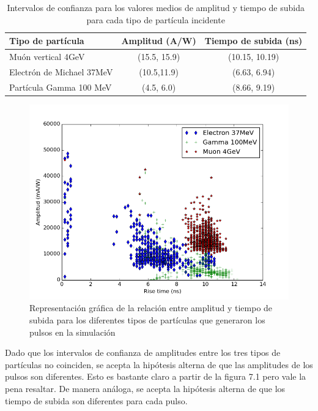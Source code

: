 \documentclass{book}
\begin{document}
\begin{table}[h]
\caption{ Intervalos de confianza para los valores medios de amplitud y tiempo de subida para cada tipo de part\'icula incidente}
\centering
\begin{tabular}{l | c c}
\hline
Tipo de part\'icula & Amplitud (A/W) & Tiempo de subida (ns) \\ \hline
Mu\'on vertical 4GeV & (15.5, 15.9) & (10.15, 10.19) \\
Electr\'on de Michael 37MeV & (10.5,11.9) & (6.63, 6.94) \\
Part\'icula Gamma 100 MeV & (4.5, 6.0) & (8.66, 9.19)\\

\hline
\end{tabular}
\end{table}

\begin{figure}[h] %
\begin{center}
 \includegraphics[width=\linewidth]{RiseTimeAmp.png}
\caption{Representaci\'on gr\'afica de la relaci\'on entre amplitud y tiempo de subida para los diferentes tipos de part\'iculas que generaron los pulsos en la simulaci\'on}
\end{center}
\end{figure}

Dado que los intervalos de confianza de amplitudes entre los tres tipos de part\'iculas no coinciden, se acepta la hip\'otesis alterna de que las amplitudes de los pulsos son diferentes. Esto es bastante claro a partir de la figura 7.1 pero vale la pena resaltar. De manera an\'aloga, se acepta la hip\'otesis alterna de que los tiempo de subida son diferentes para cada pulso.
\end{document}
